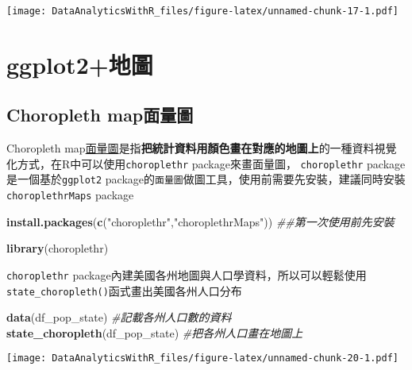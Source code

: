 \documentclass[
]{book}
\newenvironment{Shaded}{\begin{snugshade}}{\end{snugshade}}
\newcommand{\CommentTok}[1]{\textcolor[rgb]{0.56,0.35,0.01}{\textit{#1}}}
\newcommand{\KeywordTok}[1]{\textcolor[rgb]{0.13,0.29,0.53}{\textbf{#1}}}
\newcommand{\NormalTok}[1]{#1}
\newcommand{\StringTok}[1]{\textcolor[rgb]{0.31,0.60,0.02}{#1}}
\begin{document}
\texttt{[image: DataAnalyticsWithR\_files/figure-latex/unnamed-chunk-17-1.pdf]}

\hypertarget{ggplot2ux5730ux5716}{%
\section{ggplot2+地圖}\label{ggplot2ux5730ux5716}}

\hypertarget{choropleth-mapux9762ux91cfux5716}{%
\subsection{Choropleth map面量圖}\label{choropleth-mapux9762ux91cfux5716}}

Choropleth map\href{https://en.wikipedia.org/wiki/Choropleth_map}{面量圖}是指\textbf{把統計資料用顏色畫在對應的地圖上}的一種資料視覺化方式，在R中可以使用\texttt{choroplethr}\citep{R-choroplethr} package來畫面量圖，
\texttt{choroplethr} package是一個基於\texttt{ggplot2} package的\texttt{面量圖}做圖工具，使用前需要先安裝，建議同時安裝\texttt{choroplethrMaps} package

\begin{Shaded}
\begin{Highlighting}[]
\KeywordTok{install.packages}\NormalTok{(}\KeywordTok{c}\NormalTok{(}\StringTok{"choroplethr"}\NormalTok{,}\StringTok{"choroplethrMaps"}\NormalTok{)) }\CommentTok{##第一次使用前先安裝}
\end{Highlighting}
\end{Shaded}

\begin{Shaded}
\begin{Highlighting}[]
\KeywordTok{library}\NormalTok{(choroplethr)}
\end{Highlighting}
\end{Shaded}

\texttt{choroplethr}\citep{R-choroplethr} package內建美國各州地圖與人口學資料，所以可以輕鬆使用\texttt{state\_choropleth()}函式畫出美國各州人口分布

\begin{Shaded}
\begin{Highlighting}[]
\KeywordTok{data}\NormalTok{(df_pop_state) }\CommentTok{#記載各州人口數的資料}
\KeywordTok{state_choropleth}\NormalTok{(df_pop_state) }\CommentTok{#把各州人口畫在地圖上}
\end{Highlighting}
\end{Shaded}

\texttt{[image: DataAnalyticsWithR\_files/figure-latex/unnamed-chunk-20-1.pdf]}
\end{document}
